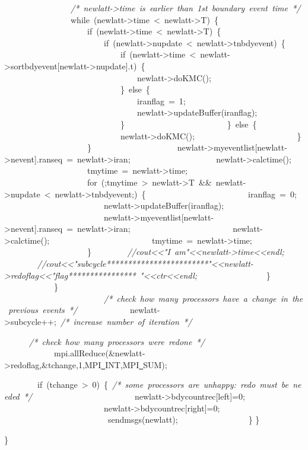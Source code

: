 {\ \ \ \ \ \ \ \ \ \ \ \ \ \ \ \ \textsl{/*\ newlatt-{}>{}time\ is\ earlier\ than\ 1st\ boundary\ event\ time\ */}
\ \ \ \ \ \ \ \ \ \ \ \ \ \ \ \ while\ (newlatt-{}>{}time\ <{}\ newlatt-{}>{}T)\ \{
\ \ \ \ \ \ \ \ \ \ \ \ \ \ \ \ \ \ \ \ if\ (newlatt-{}>{}time\ <{}\ newlatt-{}>{}T)\ \{
\ \ \ \ \ \ \ \ \ \ \ \ \ \ \ \ \ \ \ \ \ \ \ \ if\ (newlatt-{}>{}nupdate\ <{}\ newlatt-{}>{}tnbdyevent)\ \{
\ \ \ \ \ \ \ \ \ \ \ \ \ \ \ \ \ \ \ \ \ \ \ \ \ \ \ \ if\ (newlatt-{}>{}time\ <{}\ newlatt-{}>{}sortbdyevent[newlatt-{}>{}nupdate].t)\ \{
\ \ \ \ \ \ \ \ \ \ \ \ \ \ \ \ \ \ \ \ \ \ \ \ \ \ \ \ \ \ \ \ newlatt-{}>{}doKMC();
\ \ \ \ \ \ \ \ \ \ \ \ \ \ \ \ \ \ \ \ \ \ \ \ \ \ \ \ \}\ else\ \{
\ \ \ \ \ \ \ \ \ \ \ \ \ \ \ \ \ \ \ \ \ \ \ \ \ \ \ \ \ \ \ \ iranflag\ =\ 1;
\ \ \ \ \ \ \ \ \ \ \ \ \ \ \ \ \ \ \ \ \ \ \ \ \ \ \ \ \ \ \ \ newlatt-{}>{}updateBuffer(iranflag);
\ \ \ \ \ \ \ \ \ \ \ \ \ \ \ \ \ \ \ \ \ \ \ \ \ \ \ \ \}
\ \ \ \ \ \ \ \ \ \ \ \ \ \ \ \ \ \ \ \ \ \ \ \ \}\ else\ \{
\ \ \ \ \ \ \ \ \ \ \ \ \ \ \ \ \ \ \ \ \ \ \ \ \ \ \ \ newlatt-{}>{}doKMC();
\ \ \ \ \ \ \ \ \ \ \ \ \ \ \ \ \ \ \ \ \ \ \ \ \}
\ \ \ \ \ \ \ \ \ \ \ \ \ \ \ \ \ \ \ \ \}
\ \ \ \ \ \ \ \ \ \ \ \ \ \ \ \ \ \ \ \ newlatt-{}>{}myeventlist[newlatt-{}>{}nevent].ranseq\ =\ newlatt-{}>{}iran;
\ \ \ \ \ \ \ \ \ \ \ \ \ \ \ \ \ \ \ \ newlatt-{}>{}calctime();
\ \ \ \ \ \ \ \ \ \ \ \ \ \ \ \ \ \ \ \ tmytime\ =\ newlatt-{}>{}time;
\ \ \ \ \ \ \ \ \ \ \ \ \ \ \ \ \ \ \ \ for\ (;tmytime\ >{}\ newlatt-{}>{}T\ \&\&\ newlatt-{}>{}nupdate\ <{}\ newlatt-{}>{}tnbdyevent;)\ \{
\ \ \ \ \ \ \ \ \ \ \ \ \ \ \ \ \ \ \ \ \ \ \ \ iranflag\ =\ 0;
\ \ \ \ \ \ \ \ \ \ \ \ \ \ \ \ \ \ \ \ \ \ \ \ newlatt-{}>{}updateBuffer(iranflag);
\ \ \ \ \ \ \ \ \ \ \ \ \ \ \ \ \ \ \ \ \ \ \ \ newlatt-{}>{}myeventlist[newlatt-{}>{}nevent].ranseq\ =\ newlatt-{}>{}iran;
\ \ \ \ \ \ \ \ \ \ \ \ \ \ \ \ \ \ \ \ \ \ \ \ newlatt-{}>{}calctime();
\ \ \ \ \ \ \ \ \ \ \ \ \ \ \ \ \ \ \ \ \ \ \ \ tmytime\ =\ newlatt-{}>{}time;
\ \ \ \ \ \ \ \ \ \ \ \ \ \ \ \ \ \ \ \ \}
\ \ \ \ \ \ \ \ \textsl{//cout<{}<{}"{}I\ am"{}<{}<{}newlatt-{}>{}time<{}<{}endl;}
\ \ \ \ \ \ \ \ \textsl{//cout<{}<{}"{}subcycle************************"{}<{}<{}newlatt-{}>{}redoflag<{}<{}"{}flag****************\ "{}<{}<{}ctr<{}<{}endl;}
\ \ \ \ \ \ \ \ \ \ \ \ \ \ \ \ \}
\ \ \ \ \ \ \ \ \ \ \ \ \}
\ \ \ \ \ \ \ \ \ \ \
\ \ \ \ \ \ \ \ \ \ \ \ \ \textsl{/*\ check\ how\ many\ processors\ have\ a\ change\ in\ the\ previous\ events\ */}
\ \ \ \ \ \ \ \ \ \ \ \ newlatt-{}>{}subcycle++;\ \textsl{/*\ increase\ number\ of\ iteration\ */}

\ \ \ \ \ \ \textsl{/*\ check\ how\ many\ processors\ were\ redone\ */}
\ \ \ \ \ \ \ \ \ \ \ \ mpi.allReduce(\&newlatt-{}>{}redoflag,\&tchange,1,MPI\underline\ INT,MPI\underline\ SUM);
\ \ \ \

\ \ \ \ \ \ \ \ if\ (tchange\ >{}\ 0)\ \{\ \textsl{/*\ some\ processors\ are\ unhappy:\ redo\ must\ be\ needed\ */}
\ \ \ \ \ \ \ \ \ \ \ \ \ \ \ \ \ \ \ \ \ \ \ \ newlatt-{}>{}bdycountrec[left]=0;
\ \ \ \ \ \ \ \ \ \ \ \ \ \ \ \ \ \ \ \ \ \ \ \ newlatt-{}>{}bdycountrec[right]=0;
\ \ \ \ \ \ \ \ \ \ \ \ \ \ \ \ \ \ \ \ \ \ \ \ \ sendmsgs(newlatt);\ \ \ \ \
\ \ \ \ \ \ \ \ \ \ \ \ \}
\}

\}



 }
\normalfont\normalsize

